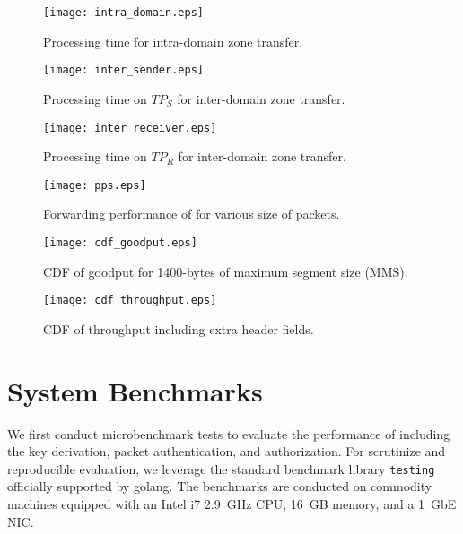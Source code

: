 \begin{figure}
	\begin{minipage}{.47\linewidth}
		\centering
		\texttt{[image: intra\_domain.eps]}
		\caption{Processing time for intra-domain zone transfer.}
		\label{fig:intra}
	\end{minipage}\hspace{1em}
	\begin{minipage}{.47\linewidth}
		\centering
		\texttt{[image: inter\_sender.eps]}
		\caption{Processing time on $TP_S$ for inter-domain zone transfer.}
		\label{fig:inter_sender}
	\end{minipage}\vspace{2em}
	\begin{minipage}{.47\linewidth}
		\centering
		\texttt{[image: inter\_receiver.eps]}
		\caption{Processing time on $TP_R$ for inter-domain zone transfer.}
		\label{fig:inter_receiver}
	\end{minipage}\hspace{1em}
	\begin{minipage}{.47\linewidth}
		\centering
		\texttt{[image: pps.eps]}
		\caption{Forwarding performance of \tp for various size of packets.}
		\label{fig:forwarding}
	\end{minipage}\vspace{2em}
	\begin{minipage}{.47\linewidth}
		\centering
		\texttt{[image: cdf\_goodput.eps]}
		\caption{CDF of goodput for 1400-bytes of maximum segment size (MMS).}
		\label{fig:goodput}
	\end{minipage}\hspace{1em}
	\begin{minipage}{.47\linewidth}
		\centering
		\texttt{[image: cdf\_throughput.eps]}
		\caption{CDF of throughput including extra header fields.}
		\label{fig:throughput}
	\end{minipage}
\end{figure}

\section{System Benchmarks}
\label{sec:systembenchmark}

We first conduct microbenchmark tests to evaluate the performance of \tp including the key
derivation, packet authentication, and authorization. For scrutinize and reproducible evaluation,
we leverage the standard benchmark library \texttt{testing} officially supported by golang.
The benchmarks are conducted on commodity machines equipped with an Intel i7 \SI{2.9}{GHz}
CPU, \SI{16}{GB} memory, and a \SI{1}{GbE} NIC.

